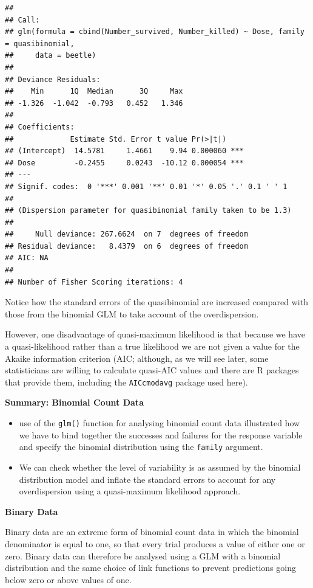 \documentclass[
]{article}
\begin{document}
\begin{verbatim}
## 
## Call:
## glm(formula = cbind(Number_survived, Number_killed) ~ Dose, family = quasibinomial, 
##     data = beetle)
## 
## Deviance Residuals: 
##    Min      1Q  Median      3Q     Max  
## -1.326  -1.042  -0.793   0.452   1.346  
## 
## Coefficients:
##             Estimate Std. Error t value Pr(>|t|)    
## (Intercept)  14.5781     1.4661    9.94 0.000060 ***
## Dose         -0.2455     0.0243  -10.12 0.000054 ***
## ---
## Signif. codes:  0 '***' 0.001 '**' 0.01 '*' 0.05 '.' 0.1 ' ' 1
## 
## (Dispersion parameter for quasibinomial family taken to be 1.3)
## 
##     Null deviance: 267.6624  on 7  degrees of freedom
## Residual deviance:   8.4379  on 6  degrees of freedom
## AIC: NA
## 
## Number of Fisher Scoring iterations: 4
\end{verbatim}

Notice how the standard errors of the quasibinomial are increased
compared with those from the binomial GLM to take account of the
overdispersion.

However, one disadvantage of quasi-maximum likelihood is that because we
have a quasi-likelihood rather than a true likelihood we are not given a
value for the Akaike information criterion (AIC; although, as we will
see later, some statisticians are willing to calculate quasi-AIC values
and there are R packages that provide them, including the
\texttt{AICcmodavg} package used here).

\textbf{Summary: Binomial Count Data}

\begin{itemize}
\item
  use of the \texttt{glm()} function for analysing binomial count data
  illustrated how we have to bind together the successes and failures
  for the response variable and specify the binomial distribution using
  the \texttt{family} argument.
\item
  We can check whether the level of variability is as assumed by the
  binomial distribution model and inflate the standard errors to account
  for any overdispersion using a quasi-maximum likelihood approach.
\end{itemize}

\textbf{Binary Data}

Binary data are an extreme form of binomial count data in which the
binomial denominator is equal to one, so that every trial produces a
value of either one or zero. Binary data can therefore be analysed using
a GLM with a binomial distribution and the same choice of link functions
to prevent predictions going below zero or above values of one.
\end{document}
